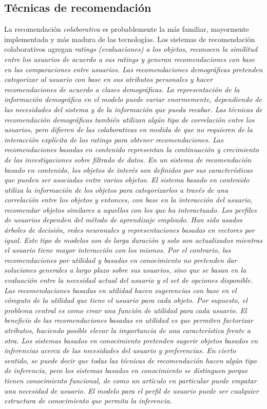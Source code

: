  	\subsection{Técnicas de recomendación}
	 	La recomendación \emph{colaborativa} es probablemente la más familiar, mayormente implementada y más madura de las tecnologías. Los sistemas de recomendación colaborativos agregan \it{ratings} (evaluaciones) a los objetos, reconocen la similitud entre los usuarios de acuerdo a sus \it{ratings} y generan recomendaciones con base en las comparaciones entre usuarios.
	 	Las recomendaciones \emph{demográficas} pretenden categorizar al usuario con base en sus atributos personales y hacer recomendaciones de acuerdo a clases demográficas. La representación de la información demográfica en el modelo puede variar enormemente, dependiendo de las necesidades del sistema y de la información que pueda recabar. Las técnicas de recomendación demográficas también utilizan algún tipo de correlación entre los usuarios, pero difieren de las colaborativas en medida de que no requieren de la interacción explícita de los ratings para obtener recomendaciones. 
	 	Las recomendaciones \emph{basadas en contenido} representan la continuación y crecimiento de las investigaciones sobre filtrado de datos. En un sistema de recomendación basado en contenido, los objetos de interés son definidos por sus características que pueden ser asociadas entre varios objetos. El sistema basado en contenido utiliza la información de los objetos para categorizarlos a través de una correlación entre los objetos y entonces, con base en la interacción del usuario, recomendar objetos similares a aquellos con los que ha interactuado. Los perfiles de usuarios dependen del método de aprendizaje empleado. Han sido usados árboles de decisión, redes neuronales y representaciones basadas en vectores por igual. Este tipo de modelos son de larga duración y solo son actualizados mientras el usuario tiene mayor interacción con los mismos.
	 	Por el contrario, las recomendaciones \emph{por utilidad} y \emph{basadas en conocimiento} no pretenden dar soluciones generales a largo plazo sobre sus usuarios, sino que se basan en la evaluación entre la necesidad actual del usuario y el set de opciones disponible. Las recomendaciones basadas en utilidad hacen sugerencias con base en el cómputo de la utilidad que tiene el usuario para cada objeto. Por supuesto, el problema central es como crear una función de utilidad para cada usuario. El beneficio de las recomendaciones basadas en utilidad es que permiten factorizar atributos, haciendo posible elevar la importancia de una característica frente a otra. 
	 	Los sistemas \emph{basados en conocimiento} pretenden sugerir objetos basados en inferencias acerca de las necesidades del usuario y preferencias. En cierto sentido, se puede decir que todas las técnicas de recomendación hacen algún tipo de inferencia, pero los sistemas basados en conocimiento se distinguen porque tienen conocimiento funcional, de como un artículo en particular puede empatar una necesidad de usuario. El modelo para el perfil de usuario puede ser cualquier estructura de conocimiento que permita la inferencia. \cite{5}

